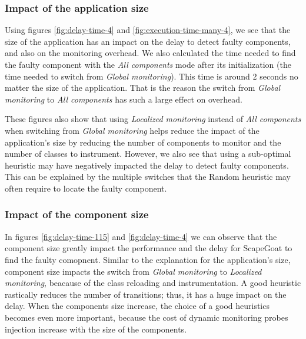 \subsubsection{Impact of the application size}
Using figures \ref{fig:delay-time-4} and \ref{fig:execution-time-many-4}, we see that the size of the application has an impact on the delay to detect faulty components, and also on the monitoring overhead.
We also calculated the time needed to find the faulty component with the \emph{All components} mode after its initialization (the time needed to switch from \emph{Global monitoring}).
This time is around 2 seconds no matter the size of the application.
That is the reason the switch from \emph{Global monitoring} to \emph{All components} has such a large effect on overhead.

These figures also show that using \emph{Localized monitoring} instead of \emph{All components} when switching from \emph{Global monitoring} helps reduce the impact of the application's size by reducing the number of components to monitor and the number of classes to instrument.
However, we also see that using a sub-optimal heuristic may have negatively impacted the delay to detect faulty components.
This can be explained by the multiple switches that the Random heuristic may often require to locate the faulty component.

\subsubsection{Impact of the component size}
In figures \ref{fig:delay-time-115} and \ref{fig:delay-time-4} we can observe that the component size greatly impact the performance and the delay for ScapeGoat to find the faulty comopnent. 
Similar to the explanation for the application's size, component size impacts the switch from \emph{Global monitoring} to \emph{Localized monitoring}, beacause of the class reloading and instrumentation.
A good heuristic rastically reduces the number of transitions; thus, it has a huge impact on the delay. 
When the components size increase, the choice of a good heuristics becomes even more important, because the cost of dynamic monitoring probes injection increase with the size of the components.

